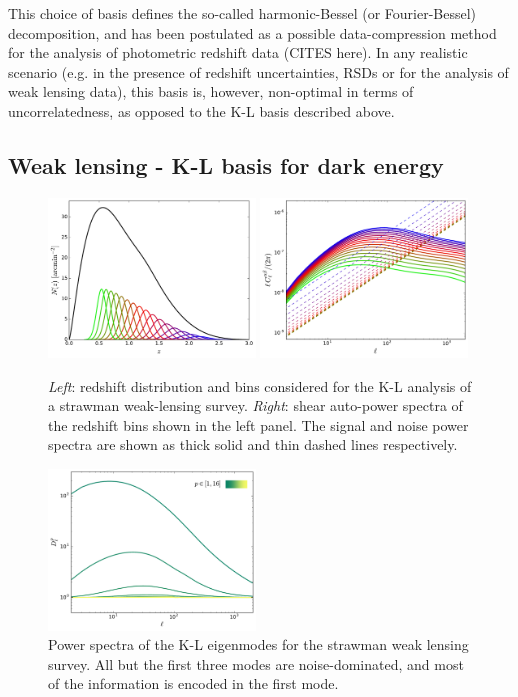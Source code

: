 \documentclass[twocolumn,amsfont,amssymb,amsmath, showpacs,balancelastpage, nofootinbib]{revtex4-1}
\begin{document}
    This choice of basis defines the so-called harmonic-Bessel (or Fourier-Bessel) decomposition, and has been postulated as a possible data-compression method for the analysis of photometric redshift data (CITES here). In any realistic scenario (e.g. in the presence of redshift uncertainties, RSDs or for the analysis of weak lensing data), this basis is, however, non-optimal in terms of uncorrelatedness, as opposed to the K-L basis described above.

  \subsection{Weak lensing - K-L basis for dark energy}\label{ssec:results.wl}
    \begin{figure}
      \centering
      \includegraphics[width=0.49\textwidth]{Figs/nz_lsst_wl}
      \includegraphics[width=0.49\textwidth]{Figs/c_ij_wl}
      \caption{{\sl Left}: redshift distribution and bins considered for the K-L analysis of a strawman weak-lensing survey. {\sl Right}: shear auto-power spectra of the redshift bins shown in the left panel. The signal and noise power spectra are shown as thick solid and thin dashed lines respectively.}\label{fig:nz_wl}
    \end{figure}
    \begin{figure}
      \centering
      \includegraphics[width=0.49\textwidth]{Figs/d_p_wl}
      \caption{Power spectra of the K-L eigenmodes for the strawman weak lensing survey. All but the first three modes are noise-dominated, and most of the information is encoded in the first mode.}\label{fig:dp_wl}
    \end{figure}
\end{document}
